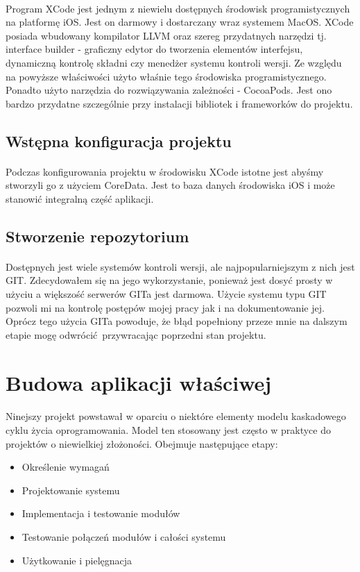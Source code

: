 \documentclass[12pt,oneside,a4paper]{report}
\begin{document}
\paragraph{}Program XCode jest jednym z niewielu dostępnych środowisk programistycznych na platformę iOS. Jest on darmowy i dostarczany wraz systemem MacOS. XCode posiada wbudowany kompilator LLVM oraz szereg przydatnych narzędzi tj. interface builder - graficzny edytor do tworzenia elementów interfejsu, dynamiczną kontrolę składni czy menedżer systemu kontroli wersji. Ze względu na powyższe właściwości użyto właśnie tego środowiska programistycznego.
Ponadto użyto narzędzia do rozwiązywania zależności - CocoaPods. Jest ono bardzo przydatne szczególnie przy instalacji bibliotek i frameworków do projektu.  
\subsection{Wstępna konfiguracja projektu}
\paragraph{}Podczas konfigurowania projektu w środowisku XCode istotne jest abyśmy stworzyli go z użyciem CoreData. Jest to baza danych środowiska iOS i może stanowić integralną część aplikacji.   
\subsection{Stworzenie repozytorium}
\paragraph{}Dostępnych jest wiele systemów kontroli wersji, ale najpopularniejszym z nich jest GIT. Zdecydowałem się na jego wykorzystanie, ponieważ jest dosyć prosty w użyciu a większość serwerów GITa jest darmowa. Użycie systemu typu GIT pozwoli mi na kontrolę postępów mojej pracy jak i na dokumentowanie jej. Oprócz tego użycia GITa powoduje, że błąd popełniony przeze mnie na dalszym etapie mogę odwrócić przywracając poprzedni stan projektu.
\pagebreak
\section{Budowa aplikacji właściwej}
\paragraph{}Ninejszy projekt powstawał w oparciu o niektóre elementy modelu kaskadowego\cite{modelKaskadowy} cyklu życia oprogramowania. Model ten stosowany jest często w praktyce do projektów o niewielkiej złożoności. Obejmuje następujące etapy:
\begin{itemize}
	\item Określenie wymagań
	\item Projektowanie systemu
	\item Implementacja i testowanie modułów
	\item Testowanie połączeń modułów i całości systemu 
	\item Użytkowanie i pielęgnacja
\end{itemize}
\end{document}
